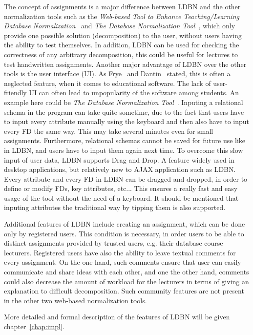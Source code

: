The concept of assignments is a major
difference between LDBN and the other normalization tools such as the
\textit{Web-based Tool to Enhance Teaching/Learning Database 
Normalization}~\cite{p8} and \textit{The Database Normalization Tool}~\cite{w1}, 
which only provide 
one possible solution (decomposition) to the user, without users having the ability to test 
themselves. In addition, LDBN can be used for checking the correctness of any
arbitrary decomposition, this could be useful for lectures to test handwritten assignments. 
Another major advantage of LDBN over the other tools is the user interface (UI). 
As Frye~\cite{p10} and Dantin~\cite{p9} stated, this is often a
neglected feature, when it comes to educational software. The lack of user-friendly UI 
can often lead to unpopularity of the software among students. An example here could be 
\textit{The Database Normalization Tool}~\cite{w1}. Inputing a relational schema in the program can
take quite sometime, due to the fact that
users have to input every attribute manually using the keyboard and then also 
have to input every FD the same way. This may take several minutes even for small  
assignments. Furthermore, relational schemas cannot be saved for future use like 
in LDBN, and users have to input them again next time. To overcome this slow input of user data, 
LDBN supports Drag and Drop. A feature widely used in desktop
applications, but relatively new to AJAX application such as LDBN. Every attribute
and every FD in LDBN can be dragged and dropped, in order 
to define or modify FDs, key attributes, etc... This ensures a really fast and easy
usage of the tool without the need of a keyboard. It should be mentioned
that inputing attributes the traditional way by tipping them is also supported.

Additional features of LDBN include creating an assignment, which can be done 
only by registered users. This condition is necessary, in order users to be able 
to distinct assignments provided by trusted users, e.g. their database course
lecturers. Registered users have also the ability to leave textual comments 
for every assignment. On the one hand, such
comments ensure that user can easily communicate and share ideas
with each other, and one the other hand, comments could also decrease the amount of workload
for the lecturers in terms of giving an explanation to difficult decomposition.
Such community features are not present in the other two web-based 
normalization tools.

More detailed and formal description of the features of LDBN will be given 
chapter~\ref{chap:impl}. 


